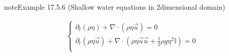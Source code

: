 \documentclass[letterpaper,10pt,english]{jupyterBook}
\begin{document}
\label{ch/pde/hyperbolic:example-9}
\begin{sphinxadmonition}{note}{Example 17.5.6 (Shallow water equations in 2\sphinxhyphen{}dimensional domain)}


\begin{equation*}
\begin{split}\begin{cases}
  \partial_t (\rho \eta) + \nabla \cdot (\rho \eta \vec{u}) = 0 \\
  \partial_t (\rho \eta \vec{u}) + \nabla \cdot \left(\rho \eta \vec{u} \vec{u} + \frac{1}{2} \rho g \eta^2 \mathbb{I} \right) = 0 \\
\end{cases}\end{split}
\end{equation*}\end{sphinxadmonition}

\sphinxstepscope
\end{document}
